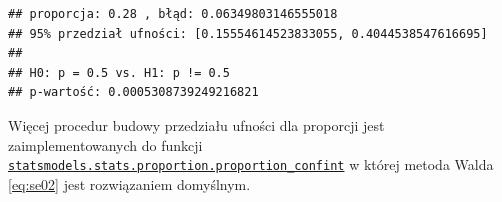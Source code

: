\documentclass[polish,]{book}
\newenvironment{Shaded}{\begin{snugshade}}{\end{snugshade}}
\newcommand{\BuiltInTok}[1]{#1}
\newcommand{\CharTok}[1]{\textcolor[rgb]{0.31,0.60,0.02}{#1}}
\newcommand{\ControlFlowTok}[1]{\textcolor[rgb]{0.13,0.29,0.53}{\textbf{#1}}}
\newcommand{\DecValTok}[1]{\textcolor[rgb]{0.00,0.00,0.81}{#1}}
\newcommand{\FloatTok}[1]{\textcolor[rgb]{0.00,0.00,0.81}{#1}}
\newcommand{\ImportTok}[1]{#1}
\newcommand{\KeywordTok}[1]{\textcolor[rgb]{0.13,0.29,0.53}{\textbf{#1}}}
\newcommand{\NormalTok}[1]{#1}
\newcommand{\OperatorTok}[1]{\textcolor[rgb]{0.81,0.36,0.00}{\textbf{#1}}}
\newcommand{\StringTok}[1]{\textcolor[rgb]{0.31,0.60,0.02}{#1}}
\begin{document}
\begin{Shaded}
\end{Shaded}

\begin{verbatim}
## proporcja: 0.28 , błąd: 0.06349803146555018
## 95% przedział ufności: [0.15554614523833055, 0.4044538547616695]
## 
## H0: p = 0.5 vs. H1: p != 0.5
## p-wartość: 0.0005308739249216821
\end{verbatim}

Więcej procedur budowy przedziału ufności dla proporcji jest zaimplementowanych do funkcji
\href{https://www.statsmodels.org/stable/generated/statsmodels.stats.proportion.proportion_confint.html\#statsmodels.stats.proportion.proportion_confint}{\texttt{statsmodels.stats.proportion.proportion\_confint}} w której metoda Walda \eqref{eq:se02} jest rozwiązaniem domyślnym.
\end{document}
